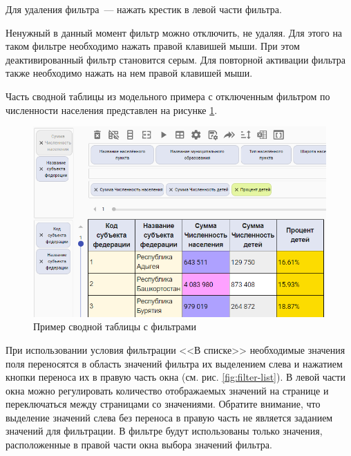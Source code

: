 \documentclass[../user-manual.tex]{subfiles}
\begin{document}
	Для удаления фильтра~--- нажать крестик в левой части фильтра.
	
	Ненужный в данный момент фильтр можно отключить, не удаляя. Для этого на таком фильтре необходимо нажать правой клавишей мыши. При этом деактивированный фильтр становится серым. Для повторной активации фильтра также необходимо нажать на нем правой клавишей мыши.
	
	Часть сводной таблицы из модельного примера с отключенным фильтром по численности населения представлен на рисунке \ref{fig:filter-example}.
	
	\begin{figure}[h]
		\centering
		\includegraphics[width=\graphicswidth]{img/22-filter-exam.png}
		\caption{Пример сводной таблицы с фильтрами}
		\label{fig:filter-example}
	\end{figure}
	
	При использовании условия фильтрации <<В списке>> необходимые значения поля переносятся в область значений фильтра их выделением слева и нажатием кнопки переноса их в правую часть окна (см. рис. \ref{fig:filter-list}). В левой части окна можно регулировать количество отображаемых значений на странице и переключаться между страницами со значениями. Обратите внимание, что выделение значений слева без переноса в правую часть не является заданием значений для фильтрации. В фильтре будут использованы только значения, расположенные в правой части окна выбора значений фильтра.
		
\end{document}

